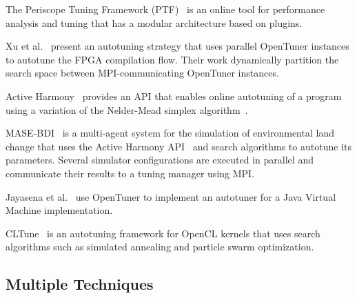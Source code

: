 The Periscope Tuning Framework
(PTF)~\cite{gerndt2005periscope,gerndt2010automatic,gerndt2017multi} is an
online tool for performance analysis and tuning that has a modular architecture
based on plugins.

Xu et al.~\cite{xu2017parallel} present an autotuning strategy that uses
parallel OpenTuner instances to autotune the FPGA compilation flow.  Their work
dynamically partition the search space between MPI-communicating OpenTuner
instances.

Active Harmony~\cite{tapus2002active} provides an API that enables
online autotuning of a program using a variation of the Nelder-Mead
simplex algorithm~\cite{nelder1965simplex}.

MASE-BDI~\cite{coelho2016mase} is a multi-agent system for the simulation of
environmental land change that uses the Active Harmony
API~\cite{tapus2002active} and search algorithms to autotune its parameters.
Several simulator configurations are executed in parallel and communicate their
results to a tuning manager using MPI.

Jayasena et al.~\cite{jayasena2015auto} use OpenTuner to implement an autotuner
for a Java Virtual Machine implementation.

CLTune~\cite{nugteren2015cltune} is an autotuning framework for OpenCL kernels
that uses search algorithms such as simulated annealing and particle swarm
optimization.

\subsection{Multiple Techniques}

